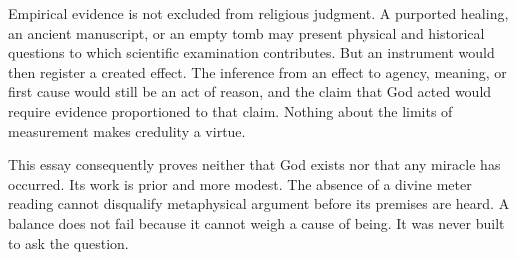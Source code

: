 Empirical evidence is not excluded from religious judgment. A purported healing, an ancient manuscript, or an empty tomb may present physical and historical questions to which scientific examination contributes. But an instrument would then register a created effect. The inference from an effect to agency, meaning, or first cause would still be an act of reason, and the claim that God acted would require evidence proportioned to that claim. Nothing about the limits of measurement makes credulity a virtue.

This essay consequently proves neither that God exists nor that any miracle has occurred. Its work is prior and more modest. The absence of a divine meter reading cannot disqualify metaphysical argument before its premises are heard. A balance does not fail because it cannot weigh a cause of being. It was never built to ask the question.
